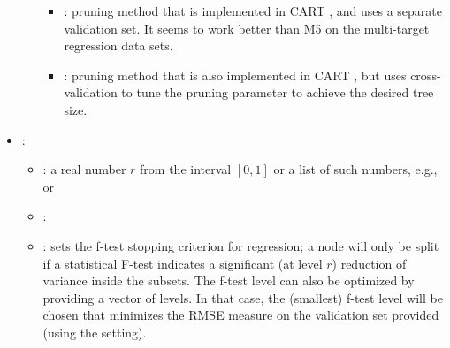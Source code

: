 \begin{itemize}
\begin{itemize}
\begin{itemize}
                    \item{}: pruning method that is implemented in CART \cite{Breiman1984}, and uses a separate validation set. It seems to work better than M5 on the multi-target regression data sets.
                    \item{}: pruning method that is also implemented in CART \cite{Breiman1984}, but uses cross-validation to tune the pruning parameter to achieve the desired tree size.
                \end{itemize}
           \end{itemize}
    \item {}:
           \begin{itemize}
                \item \optionPossibleValues{}: a real number $r$ from the interval $[0, 1]$ or a list of such numbers, e.g.,  or \formatOneElement{[0.001,0.005,0.01,0.05,0.1,0.125]}
                \item \optionDefaultValue{}: 
                \item \optionDescrption{}: sets the f-test stopping criterion for regression; a node will only be split if a statistical F-test indicates a significant (at level $r$) reduction of variance inside the subsets. The f-test level can also be optimized by providing a vector of levels. In that case, the (smallest) f-test level will be chosen that minimizes the RMSE measure on the validation set provided (using the  setting).

\end{itemize}
\end{itemize}
